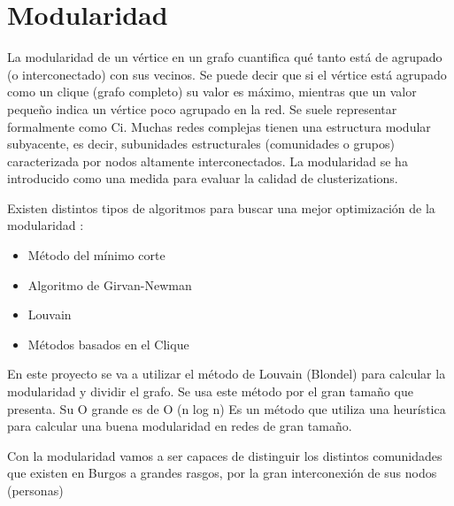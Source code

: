 \section{Modularidad} 
La modularidad de un vértice en un grafo cuantifica qué tanto está de agrupado (o interconectado) con sus vecinos. Se puede decir que si el vértice está agrupado como un clique (grafo completo) su valor es máximo, mientras que un valor pequeño indica un vértice poco agrupado en la red. Se suele representar formalmente como Ci. \cite{wiki:modularity}
Muchas redes complejas tienen una estructura modular subyacente, es decir, subunidades estructurales (comunidades o grupos) caracterizada por nodos altamente interconectados. La modularidad se ha introducido como una medida para evaluar la calidad de clusterizations. \cite{wiki:clustering}

Existen distintos tipos de algoritmos para buscar una mejor optimización de la modularidad \cite{wiki:clusteringAlgorithms}:

\begin{itemize}
    \item Método del mínimo corte
    \item Algoritmo de Girvan-Newman
    \item Louvain
    \item Métodos basados en el Clique
\end{itemize}

En este proyecto se va a utilizar el método de Louvain (Blondel) para calcular la modularidad y dividir el grafo. Se usa este método por el gran tamaño que presenta. Su O grande es de O (n log n)
Es un método que utiliza una heurística para calcular una buena modularidad en redes de gran tamaño. \cite{blondel}

Con la modularidad vamos a ser capaces de distinguir los distintos comunidades que existen en Burgos a grandes rasgos, por la gran interconexión de sus nodos (personas)






